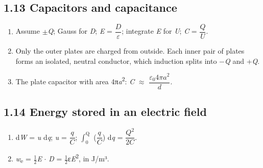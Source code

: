 \documentclass[11pt]{article}
\begin{document}
\begin{keepsection}\subsection{1.13 Capacitors and capacitance}

\begin{enumerate}
\item Assume \ensuremath{\pm}\textit{Q}; Gauss for \textit{D}; \textit{E} = {\small\ensuremath{\dfrac{{D}}{ε}}}; integrate \textit{E} for \textit{U}; \textit{C} = {\small\ensuremath{\dfrac{{Q}}{{U}}}}.
\item Only the outer plates are charged from outside. Each inner pair of plates forms an isolated, neutral conductor, which induction splits into \ensuremath{-}\textit{Q} and +\textit{Q}.
\item The plate capacitor with area 4π\textit{a}\textsuperscript{2}: \textit{C} \ensuremath{\approx} {\small\ensuremath{\dfrac{ε_{0}4π{a}^{2}}{{d}}}}.
\end{enumerate}

\end{keepsection}
\begin{keepsection}\subsection{1.14 Energy stored in an electric field}

\begin{enumerate}
\item d\textit{W} = \textit{u} d\textit{q}; \textit{u} = {\small\ensuremath{\dfrac{{q}}{{C}}}}; $\int_{0}^{\mathrm{Q}} $ ({\small\ensuremath{\dfrac{{q}}{{C}}}}) d\textit{q} = {\small\ensuremath{\dfrac{{Q}^{2}}{2{C}}}}.
\item \textit{w}\textsubscript{e} = \ensuremath{\tfrac12}\textit{E} \ensuremath{\cdot} \textit{D} = \ensuremath{\tfrac12}ε\textit{E}\textsuperscript{2}, in J/m³.
\end{enumerate}

\end{keepsection}
\end{document}
